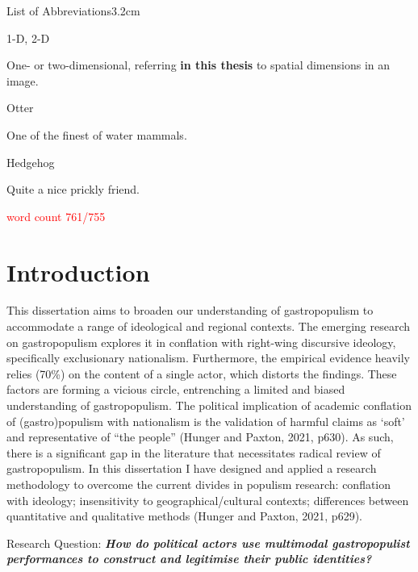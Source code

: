 \documentclass[a4paper, nobind]{templates/ociamthesis}
\begin{document}
\begin{romanpages}
\begin{mclistof}{List of Abbreviations}{3.2cm}
\item[1-D, 2-D]

One- or two-dimensional, referring \textbf{in this thesis} to spatial dimensions in an image.

\item[Otter]

One of the finest of water mammals.

\item[Hedgehog]

Quite a nice prickly friend.

\end{mclistof} 


\end{romanpages}

\flushbottom

\textcolor{red}{word count 761/755}

\hypertarget{introduction}{%
\chapter{Introduction}\label{introduction}}

This dissertation aims to broaden our understanding of gastropopulism to accommodate a range of ideological and regional contexts. The emerging research on gastropopulism explores it in conflation with right-wing discursive ideology, specifically exclusionary nationalism. Furthermore, the empirical evidence heavily relies (70\%) on the content of a single actor, which distorts the findings. These factors are forming a vicious circle, entrenching a limited and biased understanding of gastropopulism. The political implication of academic conflation of (gastro)populism with nationalism is the validation of harmful claims as `soft' and representative of ``the people'' (Hunger and Paxton, 2021, p630). As such, there is a significant gap in the literature that necessitates radical review of gastropopulism. In this dissertation I have designed and applied a research methodology to overcome the current divides in populism research: conflation with ideology; insensitivity to geographical/cultural contexts; differences between quantitative and qualitative methods (Hunger and Paxton, 2021, p629).

Research Question: \textbf{\emph{How do political actors use multimodal gastropopulist performances to construct and legitimise their public identities?}}
\end{document}
